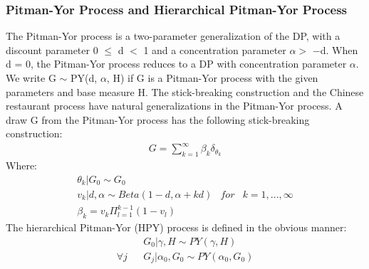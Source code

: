 \documentclass{article}
\begin{document}
\subsubsection{Pitman-Yor Process and Hierarchical Pitman-Yor Process}
The Pitman-Yor process is a two-parameter generalization of the DP, with a discount parameter 0 $\leq$ d $<$ 1 and a concentration parameter $\alpha>$ −d. 
When d = 0, the Pitman-Yor process reduces to a DP with concentration parameter $\alpha$. 
We write G $\sim$ PY(d, $\alpha$, H) if G is a Pitman-Yor process with the given parameters and base measure H.
The stick-breaking construction and the Chinese restaurant process have natural generalizations in the Pitman-Yor process. 
A draw G from the Pitman-Yor process has the following stick-breaking construction:
\begin{eqnarray*}
 G=\sum_{k=1}^{\infty} \beta_{k}\delta_{\theta_{k}}
\end{eqnarray*}
Where:
\begin{eqnarray*}
\theta_{k}|G_{0}\sim G_{0}\\
v_{k}|d,\alpha \sim Beta(1-d,\alpha+kd)  & for & k = 1,...,\infty\\
\beta_{k}=v_{k}\Pi_{l=1}^{k-1}(1-v_{l})
\end{eqnarray*}
The hierarchical Pitman-Yor (HPY) process is defined in the obvious manner:
\begin{eqnarray*}
 & &G_{0}|\gamma,H \sim PY(\gamma,H)\\
\forall j & &G_{j}|\alpha_{0},G_{0} \sim PY(\alpha_{0},G_{0}) 
\end{eqnarray*}
\end{document}

